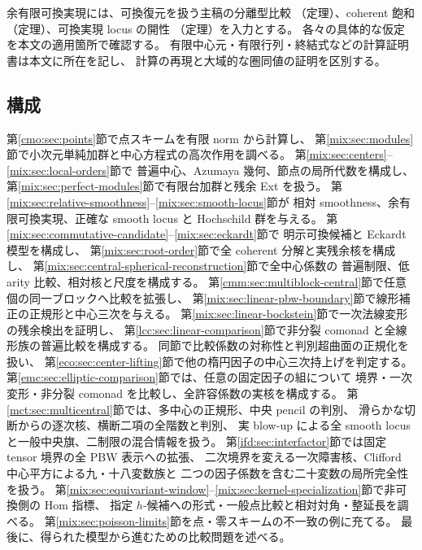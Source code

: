 余有限可換実現には、可換復元を扱う主稿の分離型比較
（定理）、coherent 飽和
（定理）、可換実現 locus の開性
（定理）を入力とする。
各々の具体的な仮定を本文の適用箇所で確認する。
有限中心元・有限行列・終結式などの計算証明書は本文に所在を記し、
計算の再現と大域的な圏同値の証明を区別する。

\subsection{構成}

第\ref{cmo:sec:points}節で点スキームを有限 norm から計算し、
第\ref{mix:sec:modules}節で小次元単純加群と中心方程式の高次作用を調べる。
第\ref{mix:sec:centers}--\ref{mix:sec:local-orders}節で
普遍中心、Azumaya 幾何、節点の局所代数を構成し、
第\ref{mix:sec:perfect-modules}節で有限台加群と残余 Ext を扱う。
第\ref{mix:sec:relative-smoothness}--\ref{mix:sec:smooth-locus}節が
相対 smoothness、余有限可換実現、正確な smooth locus と Hochschild 群を与える。
第\ref{mix:sec:commutative-candidate}--\ref{mix:sec:eckardt}節で
明示可換候補と Eckardt 模型を構成し、
第\ref{mix:sec:root-order}節で全 coherent 分解と実残余核を構成し、
第\ref{mix:sec:central-spherical-reconstruction}節で全中心係数の
普遍制限、低 arity 比較、相対核と尺度を構成する。
第\ref{cmm:sec:multiblock-central}節で任意個の同一ブロックへ比較を拡張し、
第\ref{mix:sec:linear-pbw-boundary}節で線形補正の正規形と中心三次を与える。
第\ref{mix:sec:linear-bockstein}節で一次法線変形の残余検出を証明し、
第\ref{lcc:sec:linear-comparison}節で非分裂 comonad と全線形族の普遍比較を構成する。
同節で比較係数の対称性と判別超曲面の正規化を扱い、
第\ref{eco:sec:center-lifting}節で他の楕円因子の中心三次持上げを判定する。
第\ref{emc:sec:elliptic-comparison}節では、任意の固定因子の組について
境界・一次変形・非分裂 comonad を比較し、全許容係数の実核を構成する。
第\ref{mct:sec:multicentral}節では、多中心の正規形、中央 pencil の判別、
滑らかな切断からの逐次核、横断二項の全階数と判別、
実 blow-up による全 smooth locus と一般中央旗、二制限の混合情報を扱う。
第\ref{ifd:sec:interfactor}節では固定 tensor 境界の全 PBW 表示への拡張、
二次境界を変える一次障害核、Clifford 中心平方による九・十八変数族と
二つの因子係数を含む二十変数の局所完全性を扱う。
第\ref{mix:sec:equivariant-window}--\ref{mix:sec:kernel-specialization}節で非可換側の Hom 指標、
指定 $h$-候補への形式・一般点比較と相対対角・整延長を調べる。
第\ref{mix:sec:poisson-limits}節を点・零スキームの不一致の例に充てる。
最後に、得られた模型から進むための比較問題を述べる。

